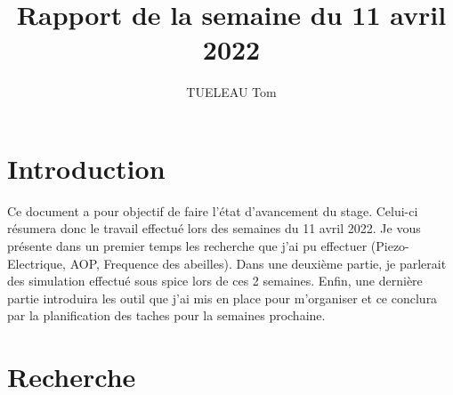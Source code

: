 \documentclass[11pt,french,a4paper]{article}
\title{Rapport de la semaine du 11 avril 2022}
\author{TUELEAU Tom}
\begin{document}
\maketitle
\section{Introduction}
Ce document a pour objectif de faire l'état d'avancement du stage. Celui-ci résumera donc le travail effectué lors des semaines du 11 avril 2022.
Je vous présente dans un premier temps les recherche que j'ai pu effectuer (Piezo-Electrique, AOP, Frequence des abeilles). Dans une deuxième partie,
je parlerait des simulation effectué sous spice lors de ces 2 semaines. Enfin, une dernière partie introduira les outil que j'ai mis en place pour 
m'organiser et ce conclura par la planification des taches pour la semaines prochaine. 

\section{Recherche}

\newpage
\listoffigures
\end{document}
